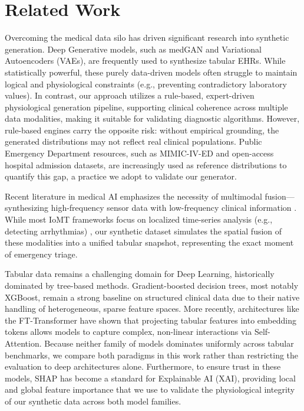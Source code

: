 \section{Related Work}

Overcoming the medical data silo has driven significant research into synthetic generation. Deep Generative models, such as medGAN \cite{choi2017} and Variational Autoencoders (VAEs), are frequently used to synthesize tabular EHRs. While statistically powerful, these purely data-driven models often struggle to maintain logical and physiological constraints (e.g., preventing contradictory laboratory values). In contrast, our approach utilizes a rule-based, expert-driven physiological generation pipeline, supporting clinical coherence across multiple data modalities, making it suitable for validating diagnostic algorithms. However, rule-based engines carry the opposite risk: without empirical grounding, the generated distributions may not reflect real clinical populations. Public Emergency Department resources, such as MIMIC-IV-ED and open-access hospital admission datasets, are increasingly used as reference distributions to quantify this gap, a practice we adopt to validate our generator.

Recent literature in medical AI emphasizes the necessity of multimodal fusion—synthesizing high-frequency sensor data with low-frequency clinical information \cite{baltrusaitis2019}. While most IoMT frameworks focus on localized time-series analysis (e.g., detecting arrhythmias) \cite{rahmani2018}, our synthetic dataset simulates the spatial fusion of these modalities into a unified tabular snapshot, representing the exact moment of emergency triage.

Tabular data remains a challenging domain for Deep Learning, historically dominated by tree-based methods. Gradient-boosted decision trees, most notably XGBoost, remain a strong baseline on structured clinical data due to their native handling of heterogeneous, sparse feature spaces. More recently, architectures like the FT-Transformer \cite{gorishniy2021} have shown that projecting tabular features into embedding tokens allows models to capture complex, non-linear interactions via Self-Attention. Because neither family of models dominates uniformly across tabular benchmarks, we compare both paradigms in this work rather than restricting the evaluation to deep architectures alone. Furthermore, to ensure trust in these models, SHAP \cite{lundberg2017} has become a standard for Explainable AI (XAI), providing local and global feature importance that we use to validate the physiological integrity of our synthetic data across both model families.

